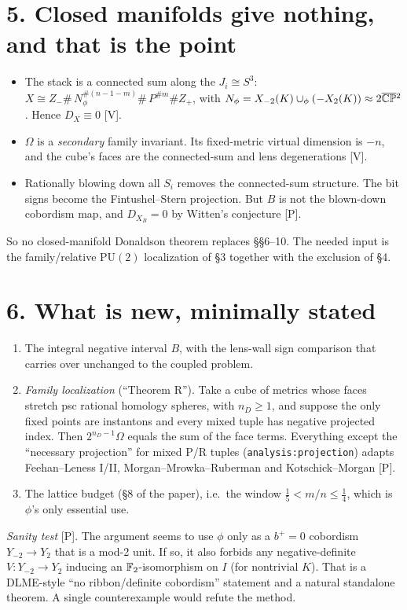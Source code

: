 \documentclass[10pt]{amsart}
\newcommand{\V}{\textsf{[V]}}\newcommand{\Pl}{\textsf{[P]}}\newcommand{\Sp}{\textsf{[S]}}
\begin{document}
\section*{5. Closed manifolds give nothing, and that is the point}
\begin{itemize}
\item The stack is a connected sum along the $J_i\cong S^3$:
$X\cong Z_-\#\,N_\phi^{\#(n-1-m)}\#\,P^{\#m}\#Z_+$, with $N_\phi=X_{-2}(K)\cup_\phi(-X_2(K))\approx2\overline{\mathbb{CP}}{}^2$. Hence $D_X\equiv0$ \V.
\item $\Omega$ is a \emph{secondary} family invariant. Its fixed-metric virtual dimension is $-n$, and the cube's faces are the connected-sum and lens degenerations \V.
\item Rationally blowing down all $S_i$ removes the connected-sum structure. The bit signs become the Fintushel--Stern projection. But $B$ is not the blown-down cobordism map, and $D_{X_B}=0$ by Witten's conjecture \Pl.
\end{itemize}
So no closed-manifold Donaldson theorem replaces \S\S6--10. The needed input is the family/relative $\mathrm{PU}(2)$ localization of \S3 together with the exclusion of \S4.

\section*{6. What is new, minimally stated}
\begin{enumerate}
\item The integral negative interval $B$, with the lens-wall sign comparison that carries over unchanged to the coupled problem.
\item \emph{Family localization} (``Theorem R''). Take a cube of metrics whose faces stretch psc rational homology spheres, with $n_D\ge1$, and suppose the only fixed points are instantons and every mixed tuple has negative projected index. Then $2^{n_D-1}\Omega$ equals the sum of the face terms. Everything except the ``necessary projection'' for mixed P/R tuples (\texttt{analysis:projection}) adapts Feehan--Leness I/II, Morgan--Mrowka--Ruberman and Kotschick--Morgan \Pl.
\item The lattice budget (\S8 of the paper), i.e.\ the window $\tfrac15<m/n\le\tfrac14$, which is $\phi$'s only essential use.
\end{enumerate}
\emph{Sanity test} \Pl. The argument seems to use $\phi$ only as a $b^+=0$ cobordism $Y_{-2}\to Y_2$ that is a mod-2 unit. If so, it also forbids any negative-definite $V\colon Y_{-2}\to Y_2$ inducing an $\mathbb F_2$-isomorphism on $I$ (for nontrivial $K$). That is a DLME-style ``no ribbon/definite cobordism'' statement and a natural standalone theorem. A single counterexample would refute the method.
\end{document}
